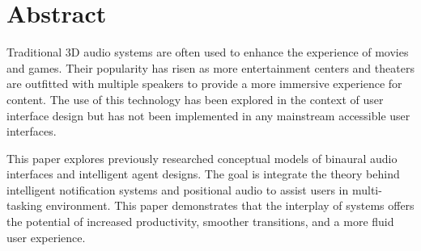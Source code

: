 \newpage                                                     \chapter{Abstract}

Traditional 3D audio systems are often used to enhance the experience of movies
and games. Their popularity has risen as more entertainment centers and theaters
are outfitted with multiple speakers to provide a more immersive experience for
content. The use of this technology has been explored in the context of user
interface design but has not been implemented in any mainstream accessible user
interfaces.

This paper explores previously researched conceptual models of binaural audio
interfaces and intelligent agent designs. The goal is integrate the theory
behind intelligent notification systems and positional audio  to assist users in
multi-tasking environment. This paper demonstrates that the interplay of systems
offers the potential of increased productivity, smoother transitions, and a more
fluid user experience.
